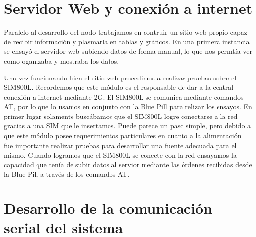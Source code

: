 \section{Servidor Web y conexión a internet}

Paralelo al desarrollo del nodo trabajamos en contruir un sitio web propio capaz de recibir información y plasmarla en tablas y gráficos.
En una primera instancia se ensayó el servidor web subiendo datos de forma manual, lo que nos permtía ver como oganizaba y mostraba los datos. \par
Una vez funcionando bien el sitio web procedimos a realizar pruebas sobre el SIM800L. Recordemos que este módulo es el responsable de dar a la central conexión
a internet mediante 2G.
El SIM800L se comunica mediante comandos AT, por lo que lo usamos en conjunto con la Blue Pill para relizar los ensayos. En primer lugar solamente
buscábamos que el SIM800L logre conectarse a la red gracias a una SIM que le insertamos. Puede parece un paso simple, pero debido a que este módulo
posee requerimientos particulares en cuanto a la alimentación fue importante realizar pruebas para desarrollar una fuente adecuada para el mismo.
Cuando logramos que el SIM800L se conecte con la red ensayamos la capacidad que tenía de subir datos al servior mediante las órdenes recibidas desde 
la Blue Pill a través de los comandos AT.\par 

\section{Desarrollo de la comunicación serial del sistema}

